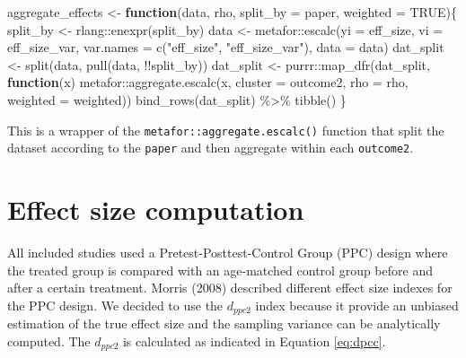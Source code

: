 \documentclass[
]{article}
\newenvironment{Shaded}{\begin{snugshade}}{\end{snugshade}}
\newcommand{\AttributeTok}[1]{\textcolor[rgb]{0.77,0.63,0.00}{#1}}
\newcommand{\ConstantTok}[1]{\textcolor[rgb]{0.00,0.00,0.00}{#1}}
\newcommand{\ControlFlowTok}[1]{\textcolor[rgb]{0.13,0.29,0.53}{\textbf{#1}}}
\newcommand{\FunctionTok}[1]{\textcolor[rgb]{0.00,0.00,0.00}{#1}}
\newcommand{\NormalTok}[1]{#1}
\newcommand{\OtherTok}[1]{\textcolor[rgb]{0.56,0.35,0.01}{#1}}
\newcommand{\SpecialCharTok}[1]{\textcolor[rgb]{0.00,0.00,0.00}{#1}}
\newcommand{\StringTok}[1]{\textcolor[rgb]{0.31,0.60,0.02}{#1}}
\begin{document}
\begin{Shaded}
\begin{Highlighting}[]
\NormalTok{aggregate\_effects }\OtherTok{\textless{}{-}} \ControlFlowTok{function}\NormalTok{(data, rho, }\AttributeTok{split\_by =}\NormalTok{ paper, }\AttributeTok{weighted =} \ConstantTok{TRUE}\NormalTok{)\{}
\NormalTok{    split\_by }\OtherTok{\textless{}{-}}\NormalTok{ rlang}\SpecialCharTok{::}\FunctionTok{enexpr}\NormalTok{(split\_by)}
\NormalTok{    data }\OtherTok{\textless{}{-}}\NormalTok{ metafor}\SpecialCharTok{::}\FunctionTok{escalc}\NormalTok{(}\AttributeTok{yi =}\NormalTok{ eff\_size, }\AttributeTok{vi =}\NormalTok{ eff\_size\_var, }
                   \AttributeTok{var.names =} \FunctionTok{c}\NormalTok{(}\StringTok{"eff\_size"}\NormalTok{, }\StringTok{"eff\_size\_var"}\NormalTok{),}
                   \AttributeTok{data =}\NormalTok{ data)}
\NormalTok{    dat\_split }\OtherTok{\textless{}{-}} \FunctionTok{split}\NormalTok{(data, }\FunctionTok{pull}\NormalTok{(data, }\SpecialCharTok{!!}\NormalTok{split\_by))}
\NormalTok{    dat\_split }\OtherTok{\textless{}{-}}\NormalTok{ purrr}\SpecialCharTok{::}\FunctionTok{map\_dfr}\NormalTok{(dat\_split, }\ControlFlowTok{function}\NormalTok{(x) metafor}\SpecialCharTok{::}\FunctionTok{aggregate.escalc}\NormalTok{(x, }\AttributeTok{cluster =}\NormalTok{ outcome2, }\AttributeTok{rho =}\NormalTok{ rho, }\AttributeTok{weighted =}\NormalTok{ weighted))}
    \FunctionTok{bind\_rows}\NormalTok{(dat\_split) }\SpecialCharTok{\%\textgreater{}\%} \FunctionTok{tibble}\NormalTok{()}
\NormalTok{\}}
\end{Highlighting}
\end{Shaded}

This is a wrapper of the \texttt{metafor::aggregate.escalc()} function that split the dataset according to the \texttt{paper} and then aggregate within each \texttt{outcome2}.

\hypertarget{effectsize}{%
\section{Effect size computation}\label{effectsize}}

All included studies used a Pretest-Posttest-Control Group (PPC) design where the treated group is compared with an age-matched control group before and after a certain treatment. Morris (2008) described different effect size indexes for the PPC design. We decided to use the \(d_{ppc2}\) index because it provide an unbiased estimation of the true effect size and the sampling variance can be analytically computed. The \(d_{ppc2}\) is calculated as indicated in Equation \eqref{eq:dpcc}.
\end{document}
